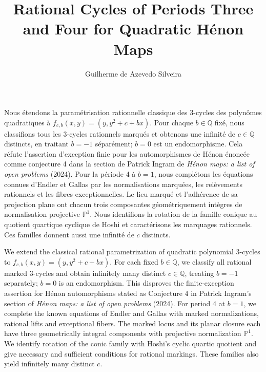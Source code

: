\documentclass{jT}
\newcommand{\Q}{\mathbb Q}
\newcommand{\PP}{\mathbb P}
\begin{document}
\title[Rational cycles for quadratic H\'enon maps]{Rational Cycles of Periods Three and Four for Quadratic H\'enon Maps}
\author{Guilherme de Azevedo Silveira}
\address{Alura\newline Rua Vergueiro, 3185, 8th floor\newline S\~ao Paulo, SP 04101-300, Brazil}
\maketitle
\begin{resume}
Nous étendons la paramétrisation rationnelle classique des 3-cycles des polynômes quadratiques à $f_{c,b}(x,y)=(y,y^2+c+bx)$. Pour chaque $b\in\Q$ fixé, nous classifions tous les 3-cycles rationnels marqués et obtenons une infinité de $c\in\Q$ distincts, en traitant $b=-1$ séparément; $b=0$ est un endomorphisme. Cela réfute l'assertion d'exception finie pour les automorphismes de H\'enon énoncée comme conjecture 4 dans la section de Patrick Ingram de \emph{H\'enon maps: a list of open problems} (2024). Pour la période 4 à $b=1$, nous complétons les équations connues d'Endler et Gallas par les normalisations marquées, les relèvements rationnels et les fibres exceptionnelles. Le lieu marqué et l'adhérence de sa projection plane ont chacun trois composantes géométriquement intègres de normalisation projective $\PP^1$. Nous identifions la rotation de la famille conique au quotient quartique cyclique de Hoshi et caractérisons les marquages rationnels. Ces familles donnent aussi une infinité de $c$ distincts.
\end{resume}
\begin{abstr}
We extend the classical rational parametrization of quadratic polynomial 3-cycles to $f_{c,b}(x,y)=(y,y^2+c+bx)$. For each fixed $b\in\Q$, we classify all rational marked 3-cycles and obtain infinitely many distinct $c\in\Q$, treating $b=-1$ separately; $b=0$ is an endomorphism. This disproves the finite-exception assertion for H\'enon automorphisms stated as Conjecture 4 in Patrick Ingram's section of \emph{H\'enon maps: a list of open problems} (2024). For period 4 at $b=1$, we complete the known equations of Endler and Gallas with marked normalizations, rational lifts and exceptional fibers. The marked locus and its planar closure each have three geometrically integral components with projective normalization $\PP^1$. We identify rotation of the conic family with Hoshi's cyclic quartic quotient and give necessary and sufficient conditions for rational markings. These families also yield infinitely many distinct $c$.
\end{abstr}
\bigskip
\end{document}
